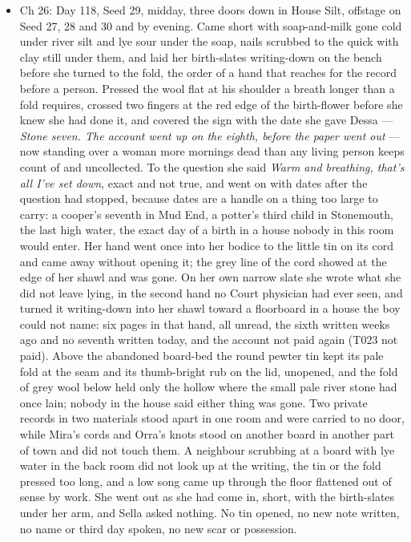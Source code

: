 \documentclass{design/chronicle}
\begin{document}
{\begin{itemize}[leftmargin=1.4em,itemsep=1pt,topsep=3pt,parsep=0pt]
\item Ch 26: Day 118, Seed 29, midday, three doors down in House Silt, offstage on Seed 27, 28 and 30 and by evening. Came short with soap-and-milk gone cold under river silt and lye sour under the soap, nails scrubbed to the quick with clay still under them, and laid her birth-slates writing-down on the bench before she turned to the fold, the order of a hand that reaches for the record before a person. Pressed the wool flat at his shoulder a breath longer than a fold requires, crossed two fingers at the red edge of the birth-flower before she knew she had done it, and covered the sign with the date she gave Dessa — \emph{Stone seven. The account went up on the eighth, before the paper went out} — now standing over a woman more mornings dead than any living person keeps count of and uncollected. To the question she said \emph{Warm and breathing, that’s all I’ve set down}, exact and not true, and went on with dates after the question had stopped, because dates are a handle on a thing too large to carry: a cooper’s seventh in Mud End, a potter’s third child in Stonemouth, the last high water, the exact day of a birth in a house nobody in this room would enter. Her hand went once into her bodice to the little tin on its cord and came away without opening it; the grey line of the cord showed at the edge of her shawl and was gone. On her own narrow slate she wrote what she did not leave lying, in the second hand no Court physician had ever seen, and turned it writing-down into her shawl toward a floorboard in a house the boy could not name: six pages in that hand, all unread, the sixth written weeks ago and no seventh written today, and the account not paid again (T023 not paid). Above the abandoned board-bed the round pewter tin kept its pale fold at the seam and its thumb-bright rub on the lid, unopened, and the fold of grey wool below held only the hollow where the small pale river stone had once lain; nobody in the house said either thing was gone. Two private records in two materials stood apart in one room and were carried to no door, while Mira’s cords and Orra’s knots stood on another board in another part of town and did not touch them. A neighbour scrubbing at a board with lye water in the back room did not look up at the writing, the tin or the fold pressed too long, and a low song came up through the floor flattened out of sense by work. She went out as she had come in, short, with the birth-slates under her arm, and Sella asked nothing. No tin opened, no new note written, no name or third day spoken, no new scar or possession.


\end{itemize}}
\end{document}
